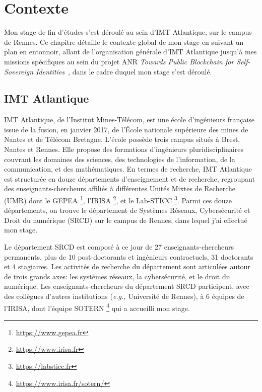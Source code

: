 \chapter{Contexte}\label{chap:contexte}

    Mon stage de fin d'études s'est déroulé au sein d'IMT Atlantique, sur le
    campus de Rennes. Ce chapitre détaille le contexte global de mon stage en
    suivant un plan en entonnoir, allant de l'organisation générale d'IMT
    Atlantique jusqu'à mes missions spécifiques au sein du projet ANR
    \textit{Towards Public Blockchain for Self-Sovereign Identities}~\cite{anr},
    dans le cadre duquel mon stage s'est déroulé.

\section{IMT Atlantique}\label{sec:imt_atlantique} 

    IMT Atlantique, de l'Institut Mines-Télécom, est une école d'ingénieurs
    française issue de la fusion, en janvier 2017, de l'École nationale
    supérieure des mines de Nantes et de Télécom Bretagne. L'école possède trois
    campus situés à Brest, Nantes et Rennes. Elle propose des formations
    d'ingénieurs pluridisciplinaires couvrant les domaines des sciences, des
    technologies de l'information, de la communication, et des mathématiques. En
    termes de recherche, IMT Atlantique est structurée en douze départements
    d'enseignement et de recherche, regroupant des enseignants-chercheurs
    affiliés à différentes Unités Mixtes de Recherche (UMR) dont le GEPEA
    \footnote{\href{https://www.gepea.fr}{https://www.gepea.fr}}, l'IRISA
    \footnote{ \href{https://www.irisa.fr}{https://www.irisa.fr}}, et le
    Lab-STICC \footnote{\href{https://labsticc.fr}{https://labsticc.fr}}. Parmi
    ces douze départements, on trouve le département de Systèmes Réseaux,
    Cybersécurité et Droit du numérique (SRCD) sur le campus de Rennes, dans
    lequel j'ai effectué mon stage.

    Le département SRCD est composé à ce jour de 27 enseignants-chercheurs
    permanents, plus de 10 post-doctorants et ingénieurs contractuels, 31
    doctorants et 4 stagiaires. Les activités de recherche du département sont
    articulées autour de trois grands axes: les systèmes réseaux, la
    cybersécurité, et le droit du numérique. Les enseignants-chercheurs du
    département SRCD participent, avec des collègues d'autres institutions
    (\emph{e.g.,} Université de Rennes), à 6 équipes de l'IRISA, dont l'équipe
    SOTERN
    \footnote{\href{https://www.irisa.fr/sotern/}{https://www.irisa.fr/sotern/}}
    qui a accueilli mon stage.

